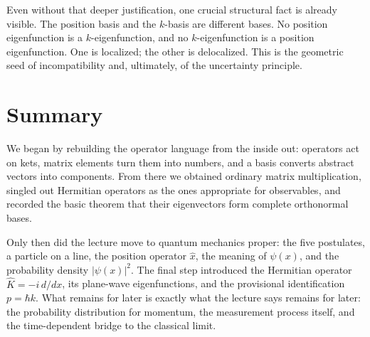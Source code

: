 Even without that deeper justification, one crucial structural fact is already visible. The position basis and the \(k\)-basis are different bases. No position eigenfunction is a \(k\)-eigenfunction, and no \(k\)-eigenfunction is a position eigenfunction. One is localized; the other is delocalized. This is the geometric seed of incompatibility and, ultimately, of the uncertainty principle.

\section{Summary}

We began by rebuilding the operator language from the inside out: operators act on kets, matrix elements turn them into numbers, and a basis converts abstract vectors into components. From there we obtained ordinary matrix multiplication, singled out Hermitian operators as the ones appropriate for observables, and recorded the basic theorem that their eigenvectors form complete orthonormal bases.

Only then did the lecture move to quantum mechanics proper: the five postulates, a particle on a line, the position operator \(\hat x\), the meaning of \(\psi(x)\), and the probability density \(|\psi(x)|^2\). The final step introduced the Hermitian operator \(\hat K=-i\,d/dx\), its plane-wave eigenfunctions, and the provisional identification \(p=\hbar k\). What remains for later is exactly what the lecture says remains for later: the probability distribution for momentum, the measurement process itself, and the time-dependent bridge to the classical limit.
